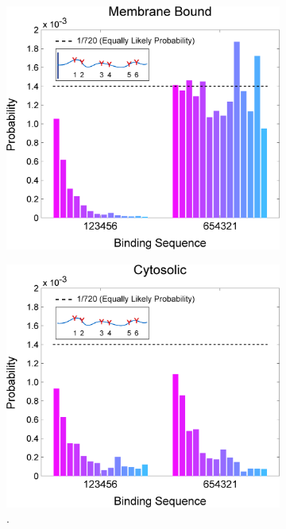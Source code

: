 \documentclass[../../AdvancementSummary.tex]{subfiles}
\begin{document}
\begin{figure}[H]
	\begin{center}
		\begin{subfigure}{0.3\linewidth}
			\includegraphics[width=\linewidth]{ResultsFigures/MultipleSequentialBinding/MemOn/ProbVSSequence.eps}
			\caption{}
		\end{subfigure}
		\begin{subfigure}{0.3\linewidth}
			\includegraphics[width=\linewidth]{ResultsFigures/MultipleSequentialBinding/MemOff/ProbVSSequence.eps}. 

\end{subfigure}
\end{center}
\end{figure}
\end{document}
